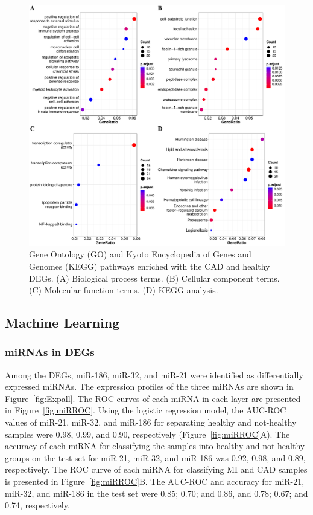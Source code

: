\documentclass[sn-mathphys,Numbered]{sn-jnl}%
\theoremstyle{thmstyleone}%
\theoremstyle{thmstyletwo}%
\theoremstyle{thmstylethree}%
\begin{document}
\begin{figure}
\centering
\includegraphics[width=0.95\linewidth]{Enrichment CAD-Healthy} \caption{Gene Ontology (GO) and Kyoto Encyclopedia of Genes and Genomes (KEGG) pathways enriched with the CAD and healthy DEGs. (A) Biological process terms. (B) Cellular component terms. (C) Molecular function terms. (D) KEGG analysis.}
\label{fig:CADHEnrich}
\end{figure}

\subsection{Machine Learning}\label{machine-learning}

\subsubsection{miRNAs in DEGs}\label{mirnas-in-degs-1}

Among the DEGs, miR-186, miR-32, and miR-21 were identified as
differentially expressed miRNAs. The expression profiles of the three
miRNAs are shown in Figure~\ref{fig:Expall}. The ROC curves of each
miRNA in each layer are presented in Figure~\ref{fig:miRROC}. Using the
logistic regression model, the AUC-ROC values of miR-21, miR-32, and
miR-186 for separating healthy and not-healthy samples were 0.98, 0.99,
and 0.90, respectively (Figure~\ref{fig:miRROC}A). The accuracy of each
miRNA for classifying the samples into healthy and not-healthy groups on
the test set for miR-21, miR-32, and miR-186 was 0.92, 0.98, and 0.89,
respectively. The ROC curve of each miRNA for classifying MI and CAD
samples is presented in Figure~\ref{fig:miRROC}B. The AUC-ROC and
accuracy for miR-21, miR-32, and miR-186 in the test set were 0.85;
0.70; and 0.86, and 0.78; 0.67; and 0.74, respectively.
\end{document}
